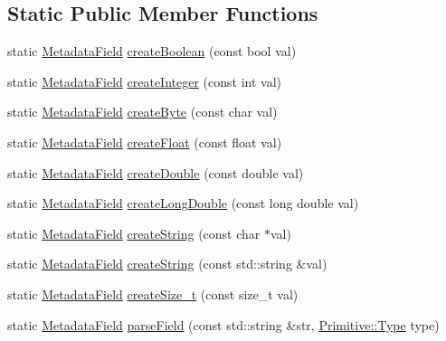\subsection*{Static Public Member Functions}
\begin{DoxyCompactItemize}
\item 
static \hyperlink{classBUSBOY_1_1MetadataField}{MetadataField} \hyperlink{classBUSBOY_1_1MetadataField_ac6a892d23c395dcbf58e54148dc430ec}{createBoolean} (const bool val)
\item 
static \hyperlink{classBUSBOY_1_1MetadataField}{MetadataField} \hyperlink{classBUSBOY_1_1MetadataField_a16cc8e792cd2309cc5f4cc1cfbabe1b8}{createInteger} (const int val)
\item 
static \hyperlink{classBUSBOY_1_1MetadataField}{MetadataField} \hyperlink{classBUSBOY_1_1MetadataField_a4f690d799c44c6f2256a5157989df197}{createByte} (const char val)
\item 
static \hyperlink{classBUSBOY_1_1MetadataField}{MetadataField} \hyperlink{classBUSBOY_1_1MetadataField_aeb0ef10cb49d068fe2cc89972acbe02f}{createFloat} (const float val)
\item 
static \hyperlink{classBUSBOY_1_1MetadataField}{MetadataField} \hyperlink{classBUSBOY_1_1MetadataField_a3c2a567f165c7ce963962eb4039fd402}{createDouble} (const double val)
\item 
static \hyperlink{classBUSBOY_1_1MetadataField}{MetadataField} \hyperlink{classBUSBOY_1_1MetadataField_aaf6e023387fae3218adfc143c90d173f}{createLongDouble} (const long double val)
\item 
static \hyperlink{classBUSBOY_1_1MetadataField}{MetadataField} \hyperlink{classBUSBOY_1_1MetadataField_a9727351c03a21a259e1bcc2b567f29e0}{createString} (const char $\ast$val)
\item 
static \hyperlink{classBUSBOY_1_1MetadataField}{MetadataField} \hyperlink{classBUSBOY_1_1MetadataField_a69d4f86a0870ec0d4f1f9cc9adb8a67a}{createString} (const std::string \&val)
\item 
static \hyperlink{classBUSBOY_1_1MetadataField}{MetadataField} \hyperlink{classBUSBOY_1_1MetadataField_a471c030db8a97853f63a602909ad6f89}{createSize\_\-t} (const size\_\-t val)
\item 
static \hyperlink{classBUSBOY_1_1MetadataField}{MetadataField} \hyperlink{classBUSBOY_1_1MetadataField_a35e8750c6a50b2aeac6a2e12f39e2d58}{parseField} (const std::string \&str, \hyperlink{classBUSBOY_1_1Primitive_afa08dc3cc68d2e851adafb0fc492cf15}{Primitive::Type} type)
\item 

\end{DoxyCompactItemize}
